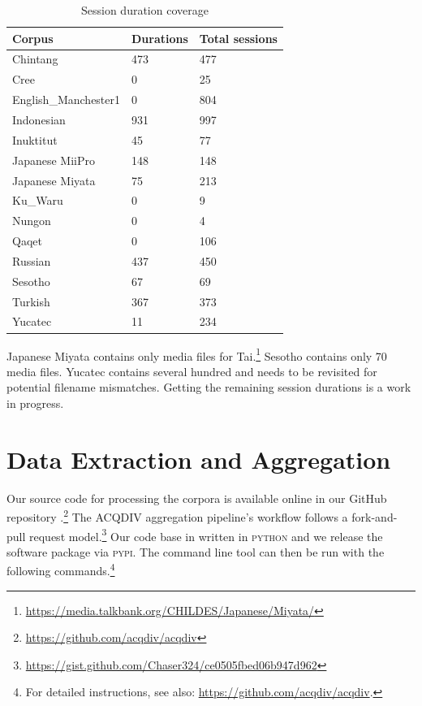 \documentclass[a4paper, 11pt]{book}
\begin{document}

\begin{table}[ht!]
	\centering
	\begin{tabular}{lll}
		\toprule
			\textbf{Corpus} & \textbf{Durations} & \textbf{Total sessions} \\
		\midrule
Chintang & 473 & 477 \\
Cree & 0 & 25 \\
English\_Manchester1 & 0 & 804 \\
Indonesian & 931 & 997 \\
Inuktitut & 45 & 77 \\
Japanese MiiPro & 148 & 148 \\
Japanese Miyata & 75 & 213 \\
Ku\_Waru & 0 & 9 \\
Nungon & 0 & 4 \\
Qaqet & 0 & 106 \\
Russian & 437 & 450 \\
Sesotho & 67 & 69 \\
Turkish & 367 & 373 \\
Yucatec & 11 & 234 \\
		\bottomrule
	\end{tabular}
	\caption{Session duration coverage}
	\label{tab:Session duration coverage}
\end{table}

Japanese Miyata contains only media files for Tai.\footnote{\url{https://media.talkbank.org/CHILDES/Japanese/Miyata/}} Sesotho contains only 70 media files. Yucatec contains several hundred and needs to be revisited for potential filename mismatches. Getting the remaining session durations is a work in progress.


\section{Data Extraction and Aggregation}
\label{sec:Building the database and postprocessing}

Our source code for processing the corpora is available online in our GitHub repository \citep{MoranJancso2019}.\footnote{\url{https://github.com/acqdiv/acqdiv}} The ACQDIV aggregation pipeline's workflow follows a fork-and-pull request model.\footnote{\url{https://gist.github.com/Chaser324/ce0505fbed06b947d962}} Our code base in written in \textsc{python} and we release the software package via \textsc{pypi}. The command line tool can then be run with the following commands.\footnote{For detailed instructions, see also: \url{https://github.com/acqdiv/acqdiv}.} 
\end{document}
